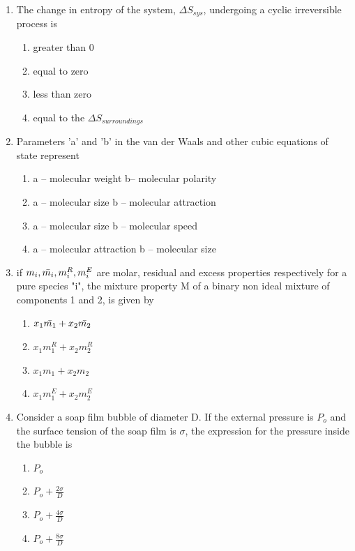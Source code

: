 \documentclass[journal,12pt,onecolumn]{IEEEtran}
\theoremstyle{remark}
\begin{document}
\begin{enumerate}
    \item The change in entropy of the system, $\Delta S_{sys}$, undergoing a cyclic irreversible process is

\begin{enumerate}
    \item greater than 0
    \item equal to zero
    \item less than zero
    \item equal to the $\Delta S_{surroundings}$
\end{enumerate}

    \item Parameters 'a' and 'b' in the van der Waals and other cubic equations of state represent

\begin{enumerate}
    \item a -- molecular weight     b-- molecular polarity
    \item a -- molecular size       b -- molecular attraction
    \item a -- molecular size       b -- molecular speed
    \item a -- molecular attraction     b -- molecular size
\end{enumerate}

    \item  if $m_i, \Bar{m_i},m_i^R, m_i^E$ are molar, residual and excess properties respectively for a pure species "i", the mixture property M of a binary non ideal mixture of components 1 and 2, is given by
\begin{multicols}{2}
    \begin{enumerate}
        \item $x_1\Bar{m_1} + x_2\Bar{m_2}$     
        \item $x_1m_1^R + x_2m_2^R$
        \item $x_1m_1 + x_2m_2$
        \item $x_1m_1^E + x_2m_2^E$
    \end{enumerate}
\end{multicols}
\newpage
\item Consider a soap film bubble of diameter D. If the external pressure is $P_o$ and the surface tension of the soap film is $\sigma$, the expression for the pressure inside the bubble is

\begin{enumerate}
    \item $P_o$
    \item $P_o+\frac{2\sigma}{D}$
    \item $P_o + \frac{4\sigma}{D}$
    \item $P_o + \frac{8\sigma}{D}$
\end{enumerate}


\end{enumerate}
\end{document}

